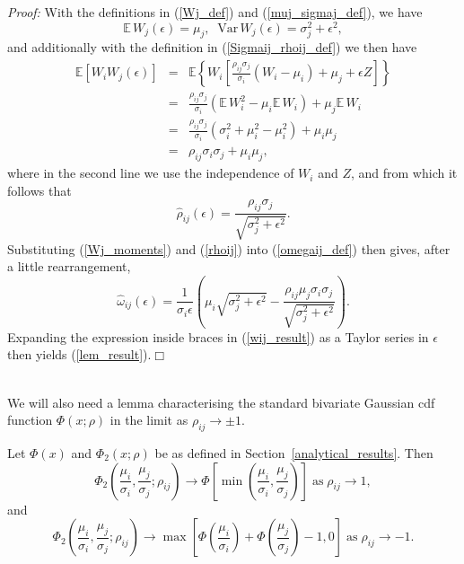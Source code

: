 \documentclass{article}
\newcommand{\ra}{\rightarrow}
\begin{document}
\noindent \textit{Proof:} With the definitions in (\ref{Wj_def}) and (\ref{muj_sigmaj_def}), we have 
\begin{equation}\label{Wj_moments}
\mathbb{E}\, W_j(\epsilon)=\mu_j,\;\;\mathrm{Var}\,W_j(\epsilon)=\sigma_j^2+\epsilon^2,
\end{equation}
and additionally with the definition in (\ref{Sigmaij_rhoij_def}) we then have\begin{eqnarray*}\mathbb{E}\left[W_i W_j(\epsilon)\right]&=&\mathbb{E}\left\{W_i\left[\displaystyle\frac{\rho_{ij}\sigma_j}{\sigma_i}(W_i-\mu_i)+\mu_j+\epsilon Z\right]\right\}\\
&=&\displaystyle\frac{\rho_{ij}\sigma_j}{\sigma_i}\left(\mathbb{E}\,W_i^2-\mu_i\mathbb{E}\,W_i\right)+\mu_j\mathbb{E}\,W_i\\
&=&\displaystyle\frac{\rho_{ij}\sigma_j}{\sigma_i}(\sigma_i^2+\mu_i^2-\mu_i^2)+\mu_i\mu_j\\
&=&\rho_{ij}\sigma_i\sigma_j+\mu_i\mu_j,\end{eqnarray*}
where in the second line we use the independence of $W_i$ and $Z$, and from which it follows that
\begin{equation}\label{rhoij}
\hat{\rho}_{ij}(\epsilon)=\frac{\rho_{ij}\sigma_j}{\sqrt{\sigma_j^2+\epsilon^2}}.
\end{equation}
Substituting (\ref{Wj_moments}) and (\ref{rhoij}) into (\ref{omegaij_def}) then gives, after a little rearrangement,
\begin{equation}\label{wij_result}\hat{\omega}_{ij}(\epsilon)=\frac{1}{\sigma_i\epsilon}\left(\mu_i\sqrt{\sigma_j^2+\epsilon^2}-\displaystyle\frac{\rho_{ij}\mu_j\sigma_i\sigma_j}{\sqrt{\sigma_j^2+\epsilon^2}}\right).
\end{equation}
Expanding the expression inside braces in (\ref{wij_result}) as a Taylor series in $\epsilon$ then yields (\ref{lem_result}).\hfill$\Box$\\
$ $

We will also need a lemma characterising the standard bivariate Gaussian cdf function $\Phi(x;\rho)$ in the limit as $\rho_{ij}\ra\pm1$.

\begin{lemma}
Let $\Phi(x)$ and $\Phi_2(x;\rho)$ be as defined in Section~\ref{analytical_results}. Then
\begin{equation}\label{Phi2_rho1}
\Phi_2\left( \frac{\mu_i}{\sigma_i}, \frac{\mu_j}{\sigma_j}; \rho_{ij} \right)\ra\Phi\left[\min\left(\frac{\mu_i}{\sigma_i},\frac{\mu_j}{\sigma_j}\right)\right]\;\textrm{as}\;\rho_{ij}\ra 1,
\end{equation}
and
\begin{equation}\label{Phi2_rho-1}
\Phi_2\left( \frac{\mu_i}{\sigma_i}, \frac{\mu_j}{\sigma_j}; \rho_{ij} \right)\ra\max\left[\Phi\left(\frac{\mu_i}{\sigma_i}\right)+\Phi\left(\frac{\mu_j}{\sigma_j}\right)-1,0\right]\;\textrm{as}\;\rho_{ij}\ra -1.\end{equation}
\end{lemma}
\end{document}

